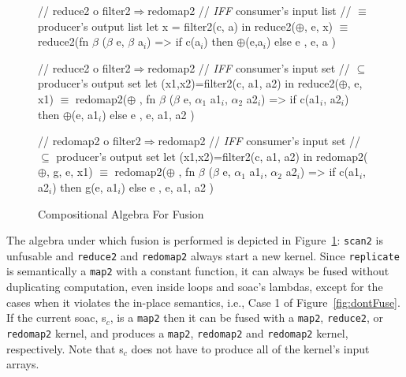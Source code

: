 \documentclass{sigplanconf}  %
\newcommand{\emp}[1]{\textcolor{DikuRed}{ #1}}
\newcommand{\emphh}[1]{\textcolor{CosGreen}{ #1}}
\newcommand{\mymath}[1]{$ #1 $}
\newcommand{\myindx}[1]{_{#1}}
\begin{document}
\begin{figure}[bt]
{\begin{minipage}{0.48\columnwidth}
\begin{colorcode}
//\emp{reduce2 o filter2\mymath{\Rightarrow}redomap2}
//\emp{{\em{}IFF} consumer's input list}
//\emp{  \mymath{\equiv} producer's output list}
let x = filter2(c, a)
in  reduce2(\mymath{\oplus}, e, x)
    \emphh{\mymath{\equiv}}
reduce2(fn \mymath{\beta} (\mymath{\beta} e, \mymath{\beta} a\mymath{\myindx{i}}) =>
  if c(a\mymath{\myindx{i}}) then \mymath{\oplus}(e,a\mymath{\myindx{i}}) else e
, e, a )

//\emp{reduce2 o filter2\mymath{\Rightarrow}redomap2}
//\emp{{\em{}IFF} consumer's input set}
//\emp{  \mymath{\subseteq} producer's output set}
let (x1,x2)=filter2(c, a1, a2)
in  reduce2(\mymath{\oplus}, e, x1)
    \emphh{\mymath{\equiv}}
redomap2(\mymath{\oplus}
, fn \mymath{\beta} (\mymath{\beta} e, \mymath{\alpha\myindx{1}} a1\mymath{\myindx{i}}, \mymath{\alpha\myindx{2}} a2\mymath{\myindx{i}})
   => if c(a1\mymath{\myindx{i}}, a2\mymath{\myindx{i}})
      then \mymath{\oplus}(e, a1\mymath{\myindx{i}}) else e
, e, a1, a2 )

//\emp{redomap2 o filter2\mymath{\Rightarrow}redomap2}
//\emp{{\em{}IFF} consumer's input set}
//\emp{  \mymath{\subseteq} producer's output set}
let (x1,x2)=filter2(c, a1, a2)
in  redomap2(\mymath{\oplus}, g, e, x1)
    \emphh{\mymath{\equiv}}
redomap2(\mymath{\oplus}
, fn \mymath{\beta} (\mymath{\beta} e, \mymath{\alpha\myindx{1}} a1\mymath{\myindx{i}}, \mymath{\alpha\myindx{2}} a2\mymath{\myindx{i}})
   => if c(a1\mymath{\myindx{i}}, a2\mymath{\myindx{i}})
      then g(e, a1\mymath{\myindx{i}}) else e
, e, a1, a2 )
\end{colorcode}
\end{minipage}
} 
\caption{Compositional Algebra For Fusion}
\label{fig:CompatFuse}
\end{figure}



%
The algebra under which fusion is performed is depicted in Figure~\ref{fig:CompatFuse}:
{\tt scan2} is unfusable and {\tt reduce2} and {\tt redomap2} always 
start a new kernel.  Since {\tt replicate} is semantically a {\tt map2} 
with a constant function, it can always be fused without duplicating
computation, even inside loops and {\sc soac}'s lambdas, except for the 
cases when it violates the in-place semantics, i.e., \emp{Case 1} of 
Figure~\ref{fig:dontFuse}.
%
If the current {\sc soac}, {\sc s}$_c$, is a {\tt map2} then it can be fused 
with a {\tt map2}, {\tt reduce2}, or {\tt redomap2} kernel, and produces 
a {\tt map2}, {\tt redomap2} and {\tt redomap2} kernel, respectively.
Note that {\sc s}$_c$ does not have to produce all of the kernel's input arrays.
\end{document}
